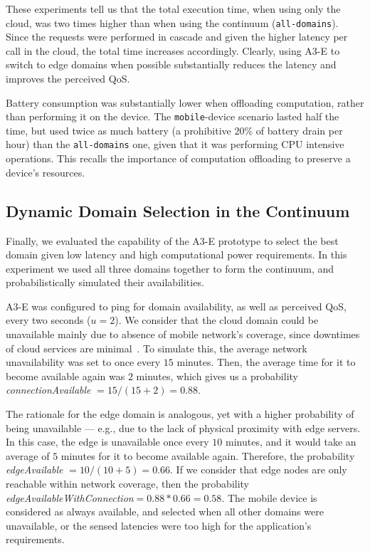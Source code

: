 These experiments tell us that the total execution time, when using only the cloud, was two times higher than when using the continuum (\texttt{all-domains}). Since the requests were performed in cascade and given the higher latency per call in the cloud, the total time increases accordingly. Clearly, using A3-E to switch to edge domains when possible substantially reduces the latency and improves the perceived QoS.

Battery consumption was substantially lower when offloading computation, rather than performing it on the device. The \texttt{mobile}-device scenario lasted half the time, but used twice as much battery (a prohibitive $20$\% of battery drain per hour) than the \texttt{all-domains} one, given that it was performing CPU intensive operations. This recalls the importance of computation offloading to preserve a device's resources.

\subsection{Dynamic Domain Selection in the Continuum}
\label{sub:domain-selection}

Finally, we evaluated the capability of the A3-E prototype to select the best domain given low latency and high computational power requirements. In this experiment we used all three domains together to form the continuum, and probabilistically simulated their availabilities. 

A3-E was configured to ping for domain availability, as well as perceived QoS, every two seconds ($u = 2$). We consider that the cloud domain could be unavailable mainly due to absence of mobile network's coverage, since downtimes of cloud services are minimal~\cite{garcia2017bandwidth}. To simulate this, the average network unavailability was set to once every $15$ minutes. Then, the average time for it to become available again was $2$ minutes, which gives us a probability \textit{connectionAvailable} $=15/(15+2)=0.88$.


The rationale for the edge domain is analogous, yet with a higher probability of  being unavailable --- e.g., due to the lack of physical proximity with edge servers. In this case, the edge is unavailable once every $10$ minutes, and it would take an average of $5$ minutes for it to become available again. Therefore, the probability \textit{edgeAvailable} $=10/(10+5)=0.66$. If we consider that edge nodes are only reachable within network coverage, then the probability \textit{edgeAvailableWithConnection}$=0.88*0.66=0.58$. The mobile device is considered as always available, and selected when all other domains were unavailable, or the sensed latencies were too high for the application's requirements. 

